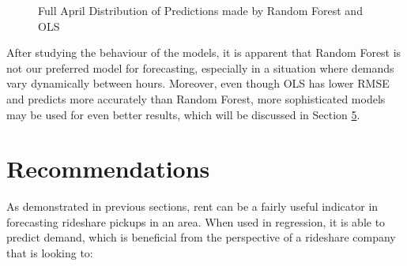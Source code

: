 \documentclass[11pt]{article}
\begin{document}
\begin{figure}[h]%

    \centering
    \qquad
    \caption{Full April Distribution of Predictions made by Random Forest and OLS}
    \label{fig:4b}%
        \label{fig:4}
\end{figure}

After studying the behaviour of the models, it is apparent that Random Forest is not our preferred model for forecasting, especially in a situation where demands vary dynamically between hours. Moreover, even though OLS has lower RMSE and predicts more accurately than Random Forest, more sophisticated models may be used for even better results, which will be discussed in Section \hyperlink{section.5}{5}.

\section{Recommendations}

As demonstrated in previous sections, rent can be a fairly useful indicator in forecasting rideshare pickups in an area. When used in regression, it is able to predict demand, which is beneficial from the perspective of a rideshare company that is looking to:
\end{document}
